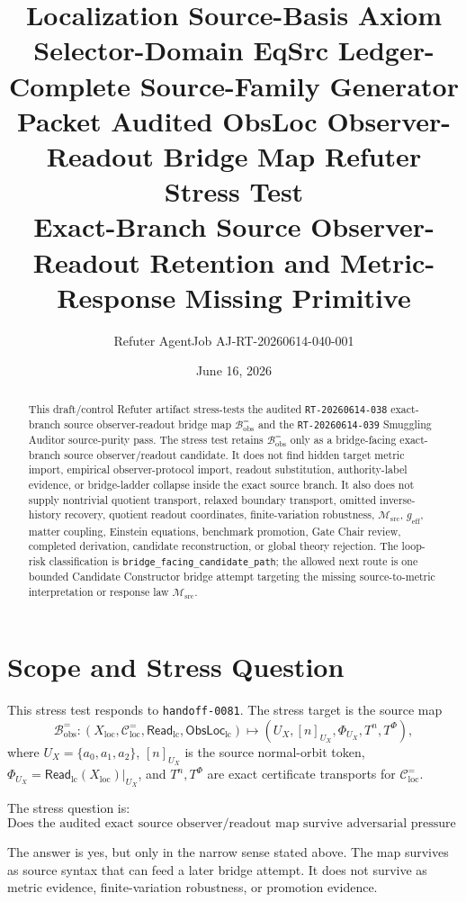 \documentclass[11pt]{article}
\title{\textbf{Localization Source-Basis Axiom Selector-Domain EqSrc Ledger-Complete Source-Family Generator Packet Audited ObsLoc Observer-Readout Bridge Map Refuter Stress Test}\\[0.35em]
\large Exact-Branch Source Observer-Readout Retention and Metric-Response Missing Primitive}
\author{Refuter AgentJob AJ-RT-20260614-040-001}
\date{June 16, 2026}
\newcommand{\ReadLC}{\mathsf{Read}_{\mathrm{lc}}}
\newcommand{\ObsLocLC}{\mathsf{ObsLoc}_{\mathrm{lc}}}
\newcommand{\Bobs}{\mathcal{B}^{=}_{\mathrm{obs}}}
\newcommand{\Msrc}{\mathcal{M}_{\mathrm{src}}}
\newcommand{\geff}{g_{\mathrm{eff}}}
\begin{document}
\maketitle

\begin{abstract}
This draft/control Refuter artifact stress-tests the audited
\texttt{RT-20260614-038} exact-branch source observer-readout bridge
map \(\Bobs\) and the \texttt{RT-20260614-039} Smuggling Auditor
source-purity pass. The stress test retains \(\Bobs\) only as a
bridge-facing exact-branch source observer/readout candidate. It does
not find hidden target metric import, empirical observer-protocol
import, readout substitution, authority-label evidence, or
bridge-ladder collapse inside the exact source branch. It also does
not supply nontrivial quotient transport, relaxed boundary transport,
omitted inverse-history recovery, quotient readout coordinates,
finite-variation robustness, \(\Msrc\), \(\geff\), matter coupling,
Einstein equations, benchmark promotion, Gate Chair review, completed
derivation, candidate reconstruction, or global theory rejection. The
loop-risk classification is
\texttt{bridge\_facing\_candidate\_path}; the allowed next route is
one bounded Candidate Constructor bridge attempt targeting the missing
source-to-metric interpretation or response law \(\Msrc\).
\end{abstract}

\section{Scope and Stress Question}

This stress test responds to \texttt{handoff-0081}. The stress target
is the source map
\[
    \Bobs
    :
    (X_{\mathrm{loc}},\mathcal{C}^{=}_{\mathrm{loc}},\ReadLC,\ObsLocLC)
    \longmapsto
    (U_X,[n]_{U_X},\Phi_{U_X},T^n,T^\Phi),
\]
where \(U_X=\{a_0,a_1,a_2\}\),
\([n]_{U_X}\) is the source normal-orbit token,
\(\Phi_{U_X}=\ReadLC(X_{\mathrm{loc}})|_{U_X}\), and
\(T^n,T^\Phi\) are exact certificate transports for
\(\mathcal{C}^{=}_{\mathrm{loc}}\).

The stress question is:
\[
    \text{Does the audited exact source observer/readout map survive
    adversarial pressure as a bridge-facing candidate path?}
\]

The answer is yes, but only in the narrow sense stated above. The map
survives as source syntax that can feed a later bridge attempt. It
does not survive as metric evidence, finite-variation robustness, or
promotion evidence.
\end{document}
